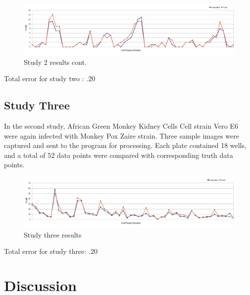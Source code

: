 \documentclass[11pt,final,twocolumn]{IEEEtran}
\begin{document}
\begin{figure}[H]
\centering
\includegraphics[width=.5\textwidth]{Study2ResultsCont.png}
\caption{Study 2 results cont.}
\label{fig:study2ResultsCont}
\end{figure}
Total error for study two : $.20$ 

\subsection{Study Three}
In the second study, African Green Monkey Kidney Cells  Cell strain Vero E6 were again infected with Monkey Pox Zaire strain. Three sample images were captured and sent to the program for processing. Each plate contained 18 wells, and a total of 52 data points were compared with corresponding truth data points.
\begin{figure}[H]
\centering
\includegraphics[width=.5\textwidth]{Study3Results.png}
\caption{Study three results}
\label{fig:study3Results}
\end{figure}
Total error for study three: $.20$ 


\section{Discussion}
\end{document}
